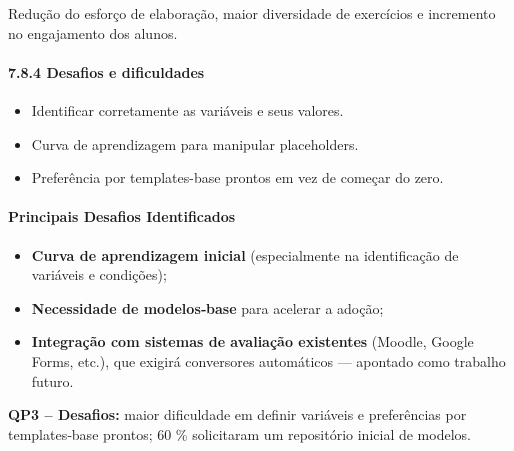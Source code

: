 Redução do esforço de elaboração, maior diversidade de exercícios e incremento no engajamento dos alunos.

\paragraph{\textbf{7.8.4 Desafios e dificuldades}}

\begin{itemize}
    \item Identificar corretamente as variáveis e seus valores.
    \item Curva de aprendizagem para manipular placeholders.
    \item Preferência por templates-base prontos em vez de começar do zero.
\end{itemize}
 

\paragraph{\textbf{Principais Desafios Identificados}}

\begin{itemize}
    \item \textbf{Curva de aprendizagem inicial} (especialmente na identificação de variáveis e condições);
    \item \textbf{Necessidade de modelos‐base} para acelerar a adoção;
    \item \textbf{Integração com sistemas de avaliação existentes} (Moodle, Google Forms, etc.), que exigirá conversores automáticos — apontado como trabalho futuro.
\end{itemize}
\textbf{QP3 – Desafios:} maior dificuldade em definir variáveis e preferências por templates‐base prontos; 60 \% solicitaram um repositório inicial de modelos. 